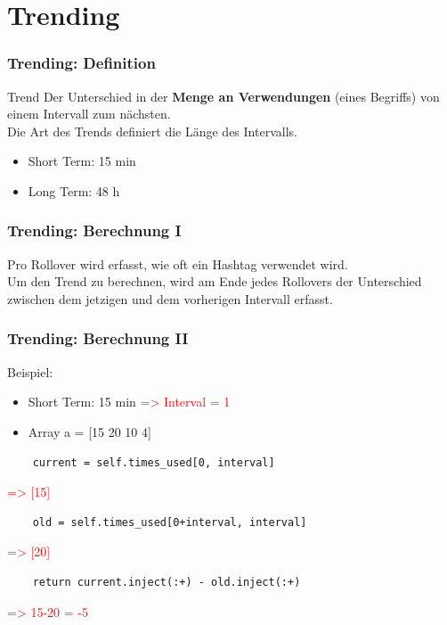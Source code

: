 \documentclass{beamer}
\begin{document}
\section{Trending}
\begin{frame}
  \frametitle{Trending: Definition} \pause
  \begin{block}{Trend}
    Der Unterschied in der \textbf{Menge an Verwendungen} (eines Begriffs) von einem Intervall zum nächsten. \\ \pause
    Die Art des Trends definiert die Länge des Intervalls. \pause
    \begin{itemize}
      \item Short Term: 15 min \pause
      \item Long Term: 48 h
    \end{itemize}
  \end{block}
\end{frame}

\begin{frame}
  \frametitle{Trending: Berechnung I} \pause
  \begin{center}
      Pro Rollover wird erfasst, wie oft ein Hashtag verwendet wird. \\ \pause
      Um den Trend zu berechnen, wird am Ende jedes Rollovers der Unterschied zwischen dem jetzigen und dem vorherigen Intervall erfasst.
  \end{center}
\end{frame}

\begin{frame}[fragile]
  \frametitle{Trending: Berechnung II} \pause
  Beispiel:
  \begin{itemize}
    \item Short Term: 15 min \pause \textcolor{red}{=> Interval = 1} \pause
    \item Array a = [15 20 10 4] \pause
  \end{itemize}
  
  \begin{lstlisting}
    current = self.times_used[0, interval]
  \end{lstlisting}\pause
  \textcolor{red}{=> [15]}\pause
  \begin{lstlisting}
    old = self.times_used[0+interval, interval]
  \end{lstlisting}\pause
  \textcolor{red}{=> [20]}\pause
  \begin{lstlisting}
    return current.inject(:+) - old.inject(:+)
  \end{lstlisting}\pause
  \textcolor{red}{=> 15-20 = -5}
\end{frame}
\end{document}
